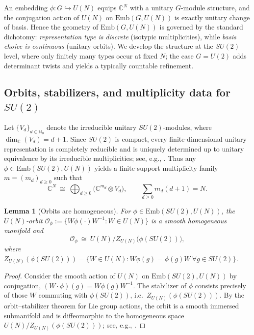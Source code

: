 \documentclass{article}%
\newtheorem{lemma}[theorem]{Lemma}
\theoremstyle{definition}
\numberwithin{equation}{section}
\newcommand{\N}{\mathbb{N}}
\newcommand{\C}{\mathbb{C}}
\newcommand{\Emb}{\mathrm{Emb}}
\begin{document}
\noindent
An embedding $\phi:G\hookrightarrow U(N)$ equips $\C^N$ with a unitary $G$-module structure, and the conjugation action of $U(N)$ on
$\Emb(G,U(N))$ is exactly unitary change of basis. Hence the geometry of $\Emb(G,U(N))$ is governed by the standard dichotomy:
\emph{representation type is discrete} (isotypic multiplicities), while \emph{basis choice is continuous} (unitary orbits).
We develop the structure at the $SU(2)$ level, where only finitely many types occur at fixed $N$; the case $G=U(2)$ adds determinant
twists and yields a typically countable refinement.

\subsection{Orbits, stabilizers, and multiplicity data for $SU(2)$}
\label{subsec:Emb_SU2_orbits_concise}

Let $\{V_d\}_{d\in\N_0}$ denote the irreducible unitary $SU(2)$-modules, where $\dim_\C(V_d)=d+1$.
Since $SU(2)$ is compact, every finite-dimensional unitary representation is completely reducible and is uniquely determined up to
unitary equivalence by its irreducible multiplicities; see, e.g., \cite{BrockerDieck1985,Hall2015,Knapp2002}.
Thus any $\phi\in\Emb(SU(2),U(N))$ yields a finite-support multiplicity family $m=(m_d)_{d\ge0}$ such that
\begin{equation}\label{eq:isotypic_decomposition_SU2_concise}
\C^N \ \cong\ \bigoplus_{d\ge0}\big(\C^{m_d}\otimes V_d\big),
\qquad
\sum_{d\ge0} m_d(d+1)=N.
\end{equation}

\begin{lemma}[Orbits are homogeneous]\label{lem:orbit_homogeneous_SU2_concise2}
For $\phi\in\Emb(SU(2),U(N))$, the $U(N)$-orbit
$\mathcal O_\phi:=\{W\phi(\cdot)W^{-1}:W\in U(N)\}$ is a smooth homogeneous manifold and
\[
\mathcal O_\phi \ \cong\ U(N)\big/ Z_{U(N)}\!\big(\phi(SU(2))\big),
\]
where $Z_{U(N)}(\phi(SU(2)))=\{W\in U(N):W\phi(g)=\phi(g)W\ \forall g\in SU(2)\}$.
\end{lemma}

\begin{proof}
Consider the smooth action of $U(N)$ on $\Emb(SU(2),U(N))$ by conjugation,
$(W\cdot \phi)(g)=W\phi(g)W^{-1}$.
The stabilizer of $\phi$ consists precisely of those $W$ commuting with $\phi(SU(2))$, i.e.\ $Z_{U(N)}(\phi(SU(2)))$.
By the orbit--stabilizer theorem for Lie group actions, the orbit is a smooth immersed submanifold and is diffeomorphic to the
homogeneous space $U(N)/Z_{U(N)}(\phi(SU(2)))$; see, e.g., \cite{Hall2015,Knapp2002}.
\end{proof}
\end{document}
